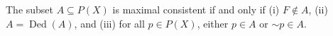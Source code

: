 The subset $A \subseteq P(X)$ is maximal consistent if and only if
(i) $F \notin A$,
(ii) $A = \operatorname{Ded}(A)$, and
(iii) for all $p \in P(X)$, either $p \in A$ or $\sim p \in A$.
